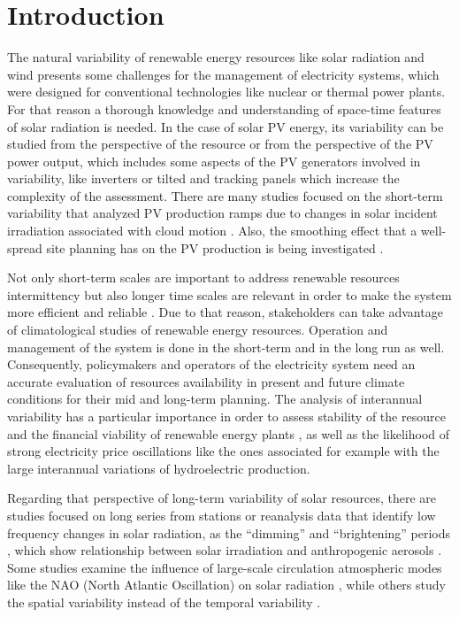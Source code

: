 \section{Introduction}

The natural variability of renewable energy resources like solar radiation and wind presents some challenges for the management of electricity systems, which were designed for conventional technologies like nuclear or thermal power plants. For that reason a thorough knowledge and understanding of space-time features of solar radiation is needed. In the case of solar PV energy,  its variability \cite*{Widen2015} can be studied from the perspective of the resource or from the perspective of the PV power output, which includes some aspects of the PV generators involved in variability, like inverters or tilted and tracking panels which increase the complexity of the assessment. There are many studies focused on the short-term variability \cite*{Zamo.Mestre.ea2014} that analyzed PV production ramps due to changes in solar incident irradiation associated with cloud motion \cite*{Cros2014, IEA-PVPS-T14-1.32015}. Also, the smoothing effect that a well-spread site planning has on the PV production is being investigated \cite*{Marcos2012, Perpinan.Marcos.ea2013}.

Not only short-term scales are important to address renewable resources intermittency but also longer time scales are relevant in order to make the system more efficient and reliable \cite*{Davy2012}. Due to that reason, stakeholders can take advantage of climatological studies of renewable energy resources. Operation and management of the system is done in the short-term and in the long run as well. Consequently, policymakers and operators of the electricity system need an accurate evaluation of resources availability in present and future climate conditions for their mid and long-term planning. The analysis of interannual variability has a particular importance in order to assess stability of the resource and the financial viability of renewable energy plants \cite*{pryor2006inter, Bryce2018}, as well as the likelihood of strong electricity price oscillations like the ones associated for example with the large interannual variations of hydroelectric production.

Regarding that perspective of long-term variability of solar resources, there are studies focused on long series from stations \cite*{Sanchez-Lorenzo2009, Sanchez-Lorenzo2013, vazquez2012interannual} or reanalysis data that identify low frequency changes in solar radiation, as the “dimming” and “brightening” periods \cite*{Wild2005}, which show relationship between solar irradiation and anthropogenic aerosols \cite*{Nabat2015}. Some studies examine the influence of large-scale circulation atmospheric modes like the NAO (North Atlantic Oscillation) on solar radiation \cite*{Pozo-Vazquez2004, Jerez2013}, while others study the spatial variability instead of the temporal variability \cite*{GueymardWilcox2011a}. 

